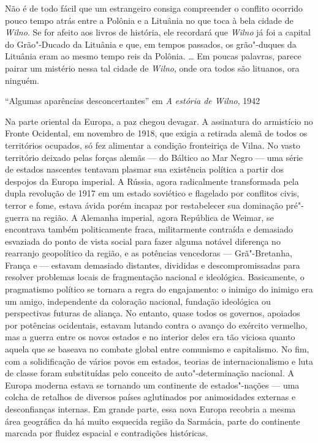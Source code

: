 \epigraph{Não é de todo fácil que um estrangeiro consiga compreender o conflito
ocorrido pouco tempo atrás entre a Polônia e a Lituânia no que toca à
bela cidade de \textit{Wilno}. Se for afeito aos livros de história, ele
recordará que \textit{Wilno} já foi a capital do Grão"-Ducado da Lituânia e que,
em tempos passados, os grão"-duques da Lituânia eram ao mesmo tempo reis
da Polônia. \ldots{} Em poucas palavras, parece pairar um mistério nessa
tal cidade de \textit{Wilno}, onde ora todos são lituanos, ora ninguém.}{``Algumas aparências desconcertantes'' em \textit{A estória de Wilno}, 1942}

Na parte oriental da Europa, a paz chegou devagar. A assinatura do
armistício no Fronte Ocidental, em novembro de 1918, que exigia a
retirada alemã de todos os territórios ocupados, só fez alimentar a
condição fronteiriça de Vilna. No vasto território deixado pelas forças
alemãs --- do Báltico ao Mar Negro --- uma série de estados nascentes
tentavam plasmar sua existência política a partir dos despojos da Europa
imperial. A Rússia, agora radicalmente transformada pela dupla revolução
de 1917 em um estado soviético e flagelado por conflitos civis, terror e
fome, estava ávida porém incapaz por restabelecer sua dominação
pré"-guerra na região. A Alemanha imperial, agora República de Weimar, se
encontrava também politicamente fraca, militarmente contraída e
demasiado esvaziada do ponto de vista social para fazer alguma notável
diferença no rearranjo geopolítico da região, e as potências vencedoras
--- Grã"-Bretanha, França e  --- estavam demasiado distantes, divididas e
descompromissadas para resolver problemas locais de fragmentação
nacional e ideológica. Basicamente, o pragmatismo político se tornara a
regra do engajamento: o inimigo do inimigo era um amigo, independente da
coloração nacional, fundação ideológica ou perspectivas futuras de
aliança. No entanto, quase todos os governos, apoiados por potências
ocidentais, estavam lutando contra o avanço do exército vermelho, mas a
guerra entre os novos estados e no interior deles era tão viciosa quanto
aquela que se baseava no combate global entre comunismo e capitalismo.
No fim, com a solidificação de vários povos em estados, teorias de
internacionalismo e luta de classe foram substituídas pelo conceito de
auto"-determinação nacional. A Europa moderna estava se tornando um
continente de estados"-nações --- uma colcha de retalhos de diversos países
aglutinados por animosidades externas e desconfianças internas. Em
grande parte, essa nova Europa recobria a mesma área geográfica da há
muito esquecida região da Sarmácia, parte do continente marcada por
fluidez espacial e contradições históricas.

